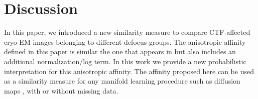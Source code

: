 \documentclass{article}
\begin{document}
\section{Discussion}
In this paper, we introduced a new similarity measure to compare CTF-affected cryo-EM images belonging to different defocus groups.  The anisotropic affinity defined in this paper is similar the one that appears in \cite{nlica, intgeom} but also includes an additional normalization/log term. In this work we provide a new probabilistic interpretation for this anisotropic affinity. The affinity proposed here can be used as a similarity measure for any manifold learning procedure \cite{intgeom, nlica} such as diffusion maps \cite{vdm, difmap}, with or without missing data.



\end{document}
